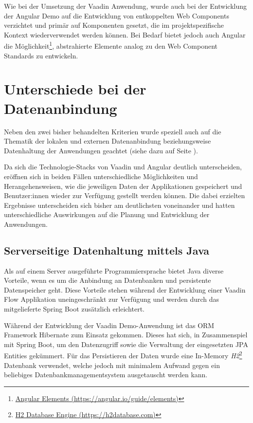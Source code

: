 \documentclass[a4paper,12pt,twoside]{scrreprt}
\begin{document}
Wie bei der Umsetzung der Vaadin Anwendung, wurde auch bei der Entwicklung der Angular Demo auf die Entwicklung von entkoppelten Web Components verzichtet und primär auf Komponenten gesetzt, die im projektspezifische Kontext wiederverwendet werden können. Bei Bedarf bietet jedoch auch Angular die Möglichkeit\footnote{\href{https://angular.io/guide/elements/}{Angular Elements (https://angular.io/guide/elements)}}, abstrahierte Elemente analog zu den Web Component Standards zu entwickeln.

\section{Unterschiede bei der Datenanbindung}
\label{sec:results-datenanbindung}
Neben den zwei bisher behandelten Kriterien wurde speziell auch auf die Thematik der lokalen und externen Datenanbindung beziehungsweise Datenhaltung der Anwendungen geachtet (siehe dazu \textit{} auf Seite \pageref{sub-sec:kriterien-datenanbindung}).

Da sich die Technologie-Stacks von Vaadin und Angular deutlich unterscheiden, eröffnen sich in beiden Fällen unterschiedliche Möglichkeiten und Herangehensweisen, wie die jeweiligen Daten der Applikationen gespeichert und Benutzer:innen wieder zur Verfügung gestellt werden können. Die dabei erzielten Ergebnisse unterscheiden sich bisher am deutlichsten voneinander und hatten unterschiedliche Auswirkungen auf die Planung und Entwicklung der Anwendungen.

\subsection{Serverseitige Datenhaltung mittels Java}
\label{sub-sec:result-datenanbindung-vaadin}
Als auf einem Server ausgeführte Programmiersprache bietet Java diverse Vorteile, wenn es um die Anbindung an Datenbanken und persistente Datenspeicher geht. Diese Vorteile stehen während der Entwicklung einer Vaadin Flow Applikation uneingeschränkt zur Verfügung und werden durch das mitgelieferte Spring Boot zusätzlich erleichtert.

\medskip

Während der Entwicklung der Vaadin Demo-Anwendung ist das ORM Framework Hibernate zum Einsatz gekommen. Dieses hat sich, in Zusammenspiel mit Spring Boot, um den Datenzugriff sowie die Verwaltung der eingesetzten \ac{JPA} Entities gekümmert. Für das Persistieren der Daten wurde eine In-Memory \textit{H2}\footnote{\href{https://h2database.com/}{H2 Database Engine (https://h2database.com)}} Datenbank verwendet, welche jedoch mit minimalem Aufwand gegen ein beliebiges Datenbankmanagementsystem ausgetauscht werden kann.
\end{document}
